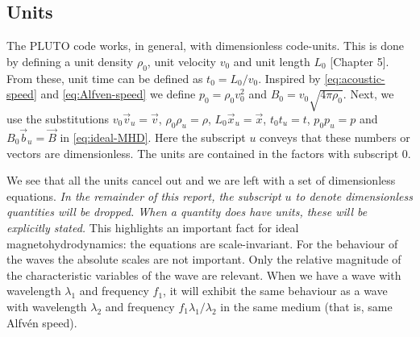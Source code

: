 \subsection{Units}
\label{sec:units}
The PLUTO code works, in general, with dimensionless code-units. This is done by defining a unit density $\rho_0$, unit velocity $v_0$ and unit length $L_0$ \cite{pluto-manual} [Chapter 5].
From these, unit time can be defined as $t_0=L_0/v_0$. Inspired by \cref{eq:acoustic-speed} and \cref{eq:Alfven-speed} we define $p_0=\rho_0v_0^2$ and $B_0=v_0\sqrt{4\pi\rho_0}$.
Next, we use the substitutions $v_0\vec{v}_u=\vec{v}$, $\rho_0\rho_u=\rho$, $L_0\vec{x}_u=\vec{x}$, $t_0t_u=t$, $p_0p_u=p$ and $B_0\vec{b}_u=\vec{B}$ in \cref{eq:ideal-MHD}.
Here the subscript $u$ conveys that these numbers or vectors are dimensionless. The units are contained in the factors with subscript $0$.

{\centering 
\noindent {}
\par}

We see that all the units cancel out and we are left with a set of dimensionless equations.
\emph{In the remainder of this report, the subscript $u$ to denote dimensionless quantities will be dropped. When a quantity does have units, these will be explicitly stated.}
This highlights an important fact for ideal magnetohydrodynamics: the equations are scale-invariant.
For the behaviour of the waves the absolute scales are not important. Only the relative magnitude of the characteristic variables of the wave are relevant.
When we have a wave with wavelength $\lambda_1$ and frequency $f_1$, it will exhibit the same behaviour as a wave with wavelength $\lambda_2$ and frequency $f_1 \lambda_1/\lambda_2$ in the same medium (that is, same Alfvén speed).

